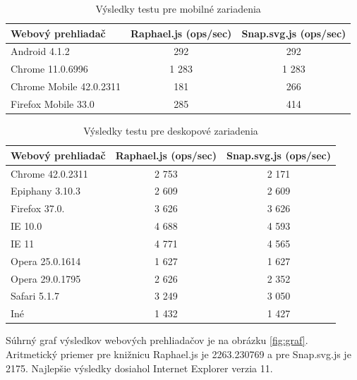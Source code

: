\begin{table}[H]
	
\begin{center}

\begin{tabular}{|l|c|c|}
	\hline \textbf{Webový prehliadač} & \textbf{Raphael.js (ops/sec)} & \textbf{Snap.svg.js (ops/sec)} \\ 
	\hline Android 4.1.2 & 292 & 292 \\ 
	\hline Chrome 11.0.6996 & 1 283 & 1 283 \\ 
	\hline Chrome Mobile 42.0.2311 & 181 & 266 \\ 
	\hline Firefox Mobile 33.0 & 285 & 414 \\ 
	\hline 
\end{tabular} 
\end{center}

\caption{Výsledky testu pre mobilné zariadenia}
\label{tab:mobily}
	\end{table}

\begin{table}[H]
\begin{center}
		\begin{tabular}{|l|c|c|}
		\hline \textbf{Webový prehliadač} & \textbf{Raphael.js (ops/sec)} & \textbf{Snap.svg.js (ops/sec)} \\ 
		\hline Chrome 42.0.2311 & 2 753 & 2 171 \\ 
		\hline Epiphany 3.10.3 & 2 609 & 2 609 \\ 
		\hline Firefox 37.0. & 3 626 & 3 626 \\ 
	
			\hline IE 10.0 & 4 688 & 4 593 \\ 
			\hline IE 11 & 4 771 & 4 565 \\ 
			\hline Opera 25.0.1614 & 1 627 & 1 627 \\ 
			\hline Opera 29.0.1795 & 2 626 & 2 352 \\ 
			\hline Safari 5.1.7 & 3 249 & 3 050 \\ 
			\hline Iné & 1 432 & 1 427 \\ 
			\hline 
	
	\end{tabular} 
	
\end{center}
	\caption{Výsledky testu pre deskopové zariadenia}
	\label{tab:pocitace}
\end{table}

Súhrný graf výsledkov webových prehliadačov je na obrázku \ref{fig:graf}. Aritmetický priemer pre knižnicu Raphael.js je 2263.230769 a pre Snap.svg.js je 2175. Najlepšie výsledky dosiahol Internet Explorer verzia 11. 

